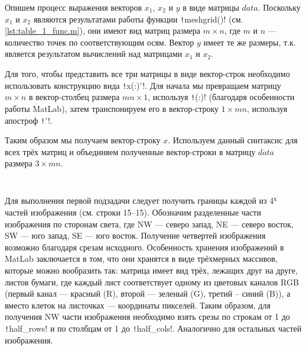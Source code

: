 Опишем процесс выражения векторов $x_1$, $x_2$ и $y$ в виде матрицы $data$.
Поскольку $x_1$ и $x_2$ являются результатами работы функции \texttt!meshgrid()! (см. \cref{lst:table_1_func.m}), они имеют вид матриц размера $m \times n$, где $m$ и $n$ --- количество точек по соответствующим осям.
Вектор $y$ имеет те же размеры, т.к. является результатом вычислений над матрицами $x_1$ и $x_2$.

Для того, чтобы представить все три матрицы в виде вектор-строк необходимо использовать конструкцию вида \texttt!x(:)'!.
Для начала мы превращаем матрицу $m \times n$ в вектор-столбец размера $mn \times 1$, используя \texttt!(:)! (благодаря особенности работы MatLab), затем транспонируем его в вектор-строку $1 \times mn$, используя апостроф \texttt!'!.

Таким образом мы получаем вектор-строку $x$.
Используем данный синтаксис для всех трёх матриц и объединяем полученные вектор-строки в матрицу $data$ размера $3 \times mn$.


\subsection*{  }
\begin{quote}
    \textit{\exFour}
\end{quote}

\begin{codemultipage}
    \inputminted{matlab}{code/image_ex.m}
\end{codemultipage}

Для выполнения первой подзадачи следует получить границы каждой из 4${}^\underline{\text{х}}$ частей изображения (см. строки 15--15).
Обозначим разделенные части изображения по сторонам света, где NW --- северо запад, NE --- северо восток, SW --- юго запад, SE --- юго восток.
Получение четвертей изображения возможно благодаря срезам исходного.
Особенность хранения изображений в MatLab заключается в том, что они хранятся в виде трёхмерных массивов, которые можно вообразить так: матрица имеет вид трёх, лежащих друг на друге, листов бумаги, где каждый лист соответствует одному из цветовых каналов RGB (первый канал --- красный (R), второй --- зеленый (G), третий -- синий (B)), а вместо клеток на листочках --- координаты пикселей.
Таким образом, для получения NW части изображения необходимо взять срезы по строкам от 1 до \texttt!half_rows! и по столбцам от 1 до \texttt!half_cols!.
Аналогично для остальных частей изображения.


